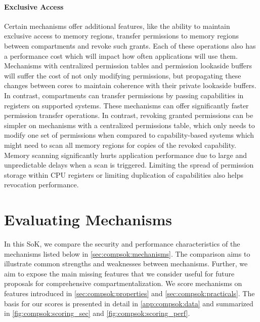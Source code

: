 \paragraph{Exclusive Access}
Certain mechanisms offer additional features, like the ability to maintain
exclusive access to memory regions, transfer permissions to memory regions
between compartments and revoke such grants.
Each of these operations also has a performance cost which will impact
how often applications will use them.
Mechanisms with centralized permission tables and permission lookaside
buffers will suffer the cost of not only modifying permissions, but
propagating these changes between cores to maintain coherence with 
their private lookaside buffers.
In contrast, compartments can transfer permissions by passing capabilities
in registers on supported systems. 
These mechanisms can offer significantly faster permission transfer
operations.
In contrast, revoking granted permissions can be simpler on mechanisms with
a centralized permissions table, which only needs to modify one set of 
permissions when compared to capability-based systems which might need to
scan all memory regions for copies of the revoked capability.
Memory scanning significantly hurts application performance due to large and 
unpredictable delays when a scan is triggered.
Limiting the spread of permission storage within CPU registers or limiting
duplication of capabilities also helps revocation performance.

\section{Evaluating Mechanisms}
\label{sec:compsok:evaluation}
In this SoK, we compare the security and performance characteristics of the 
mechanisms listed below in \autoref{sec:compsok:mechanisms}.
The comparison aims to illustrate common strengths and weaknesses between
mechanisms.
Further, we aim to expose the main missing features that we consider 
useful for future proposals for comprehensive compartmentalization.
We score mechanisms on features introduced in 
\autoref{sec:compsok:properties} and 
\autoref{sec:compsok:practicals}.
The basis for our scores is presented in detail in \autoref{app:compsok:data}
and summarized in \autoref{fig:compsok:scoring_sec} and
\autoref{fig:compsok:scoring_perf}.

